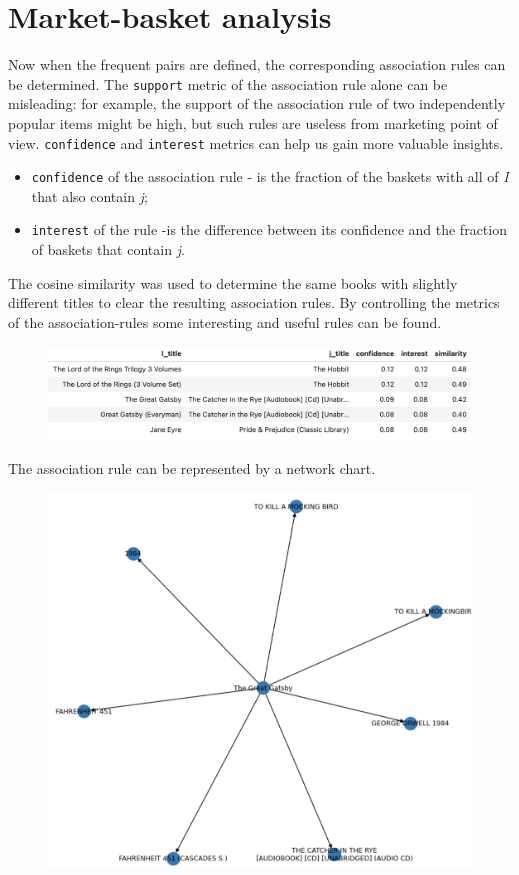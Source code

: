 % 
% 
\chapter{Market-basket analysis}
\label{chap:market-basket}

Now when the frequent pairs are defined, the corresponding association rules can be determined.
The \texttt{support} metric of the association rule alone can be misleading: for example, the support of the association rule of two independently popular items might be high, but such rules are useless from marketing point of view. 
\texttt{confidence} and \texttt{interest} metrics can help us gain more valuable insights.
\begin{itemize}
	\item \texttt{confidence} of the association rule - is the fraction of the baskets with all of \textit{I} that also contain \textit{j};
	\item \texttt{interest} of the rule -is the difference between its confidence and the fraction of baskets that contain \textit{j}.
\end{itemize}

The cosine similarity was used to determine the same books with slightly different titles to clear the resulting association rules. 
By controlling the metrics of the association-rules some interesting and useful rules can be found.

\begin{figure}[h]
	\includegraphics[width=14cm]{images/5-association_rules}
\centering
\end{figure}

\newpage
The association rule can be represented by a network chart.

\begin{figure}[h]
	\includegraphics[width=12cm]{images/5-gatsby_associations}
\centering
\end{figure}


